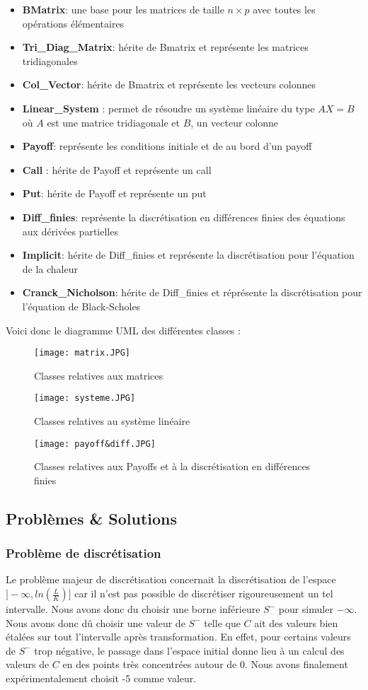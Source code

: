 \documentclass[11pt,a4paper]{article}
\begin{document}
\begin{itemize}
  \item \textbf{BMatrix}: une base pour les matrices de taille $n\times p$ avec toutes les opérations élémentaires 
  \item \textbf{Tri\_Diag\_Matrix}: hérite de Bmatrix et représente les matrices tridiagonales
  \item \textbf{Col\_Vector}: hérite de Bmatrix et représente les vecteurs colonnes
  \item \textbf{Linear\_System} : permet de résoudre un système linéaire du type $AX=B$ où $A$ est une matrice tridiagonale et $B$, un vecteur colonne
  \item \textbf{Payoff}: représente les conditions initiale et de au bord d'un payoff
  \item \textbf{Call} : hérite de Payoff et représente un call
  \item \textbf{Put}: hérite de Payoff et représente un put
  \item \textbf{Diff\_finies}: représente la discrétisation en différences finies des équations aux dérivées partielles
  \item \textbf{Implicit}: hérite de Diff\_finies et représente la discrétisation pour l'équation de la chaleur
  \item \textbf{Cranck\_Nicholson}: hérite de Diff\_finies et réprésente la discrétisation pour l'équation de Black-Scholes 
\end{itemize}
Voici donc le diagramme UML des différentes classes :
\begin{figure}[!h]
    \center
    \texttt{[image: matrix.JPG]} 
    \caption{Classes relatives aux matrices}
\end{figure}
\newpage
\begin{figure}[!h]
    \center
    \texttt{[image: systeme.JPG]} 
    \caption{Classes relatives au système linéaire}
\end{figure}
\begin{figure}[!h]
    \center
    \texttt{[image: payoff\&diff.JPG]} 
    \caption{Classes relatives aux Payoffs et à la discrétisation en différences finies}
\end{figure}
\newpage
\subsection{Problèmes \& Solutions}
\subsubsection{Problème de discrétisation}
Le problème majeur de discrétisation concernait la discrétisation de l'espace $]-\infty , ln(\frac{L}{K})]$ car il n'est pas possible de discrétiser rigoureusement un tel intervalle. Nous avons donc du choisir une borne inférieure $S^-$ pour simuler $-\infty$.
Nous avons donc dû choisir une valeur de $S^-$ telle que $C$ ait des valeurs bien étalées sur tout l'intervalle après transformation. En effet, pour certains valeurs de $S^-$ trop négative, le passage dans l'espace initial donne lieu à un calcul des valeurs de $C$ en des points très concentrées autour de 0. Nous avons finalement expérimentalement choisit -5 comme valeur.
\end{document}
